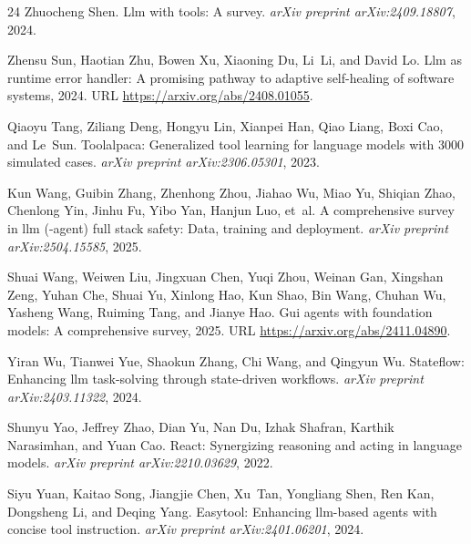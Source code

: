 \begin{thebibliography}{24}
Zhuocheng Shen.
\newblock Llm with tools: A survey.
\newblock \emph{arXiv preprint arXiv:2409.18807}, 2024.

Zhensu Sun, Haotian Zhu, Bowen Xu, Xiaoning Du, Li~Li, and David Lo.
\newblock Llm as runtime error handler: A promising pathway to adaptive self-healing of software systems, 2024.
\newblock URL \url{https://arxiv.org/abs/2408.01055}.

Qiaoyu Tang, Ziliang Deng, Hongyu Lin, Xianpei Han, Qiao Liang, Boxi Cao, and Le~Sun.
\newblock Toolalpaca: Generalized tool learning for language models with 3000 simulated cases.
\newblock \emph{arXiv preprint arXiv:2306.05301}, 2023.

Kun Wang, Guibin Zhang, Zhenhong Zhou, Jiahao Wu, Miao Yu, Shiqian Zhao, Chenlong Yin, Jinhu Fu, Yibo Yan, Hanjun Luo, et~al.
\newblock A comprehensive survey in llm (-agent) full stack safety: Data, training and deployment.
\newblock \emph{arXiv preprint arXiv:2504.15585}, 2025{}.

Shuai Wang, Weiwen Liu, Jingxuan Chen, Yuqi Zhou, Weinan Gan, Xingshan Zeng, Yuhan Che, Shuai Yu, Xinlong Hao, Kun Shao, Bin Wang, Chuhan Wu, Yasheng Wang, Ruiming Tang, and Jianye Hao.
\newblock Gui agents with foundation models: A comprehensive survey, 2025{}.
\newblock URL \url{https://arxiv.org/abs/2411.04890}.

Yiran Wu, Tianwei Yue, Shaokun Zhang, Chi Wang, and Qingyun Wu.
\newblock Stateflow: Enhancing llm task-solving through state-driven workflows.
\newblock \emph{arXiv preprint arXiv:2403.11322}, 2024.

Shunyu Yao, Jeffrey Zhao, Dian Yu, Nan Du, Izhak Shafran, Karthik Narasimhan, and Yuan Cao.
\newblock React: Synergizing reasoning and acting in language models.
\newblock \emph{arXiv preprint arXiv:2210.03629}, 2022.

Siyu Yuan, Kaitao Song, Jiangjie Chen, Xu~Tan, Yongliang Shen, Ren Kan, Dongsheng Li, and Deqing Yang.
\newblock Easytool: Enhancing llm-based agents with concise tool instruction.
\newblock \emph{arXiv preprint arXiv:2401.06201}, 2024.


\end{thebibliography}
